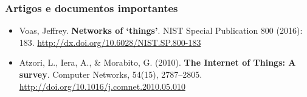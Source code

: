 \documentclass{beamer}
\begin{document}
\begin{frame}
\frametitle{Artigos e documentos importantes}
\begin{itemize}	
	\item Voas, Jeffrey. \textbf{Networks of ‘things’}. NIST Special Publication 800 (2016): 183. \url{http://dx.doi.org/10.6028/NIST.SP.800-183}
	
	\item Atzori, L., Iera, A., \& Morabito, G. (2010). \textbf{The Internet of Things: A survey}. Computer Networks, 54(15), 2787–2805. \url{http://doi.org/10.1016/j.comnet.2010.05.010}
\end{itemize}
\end{frame}

\frame{\titlepage}
\end{document}
